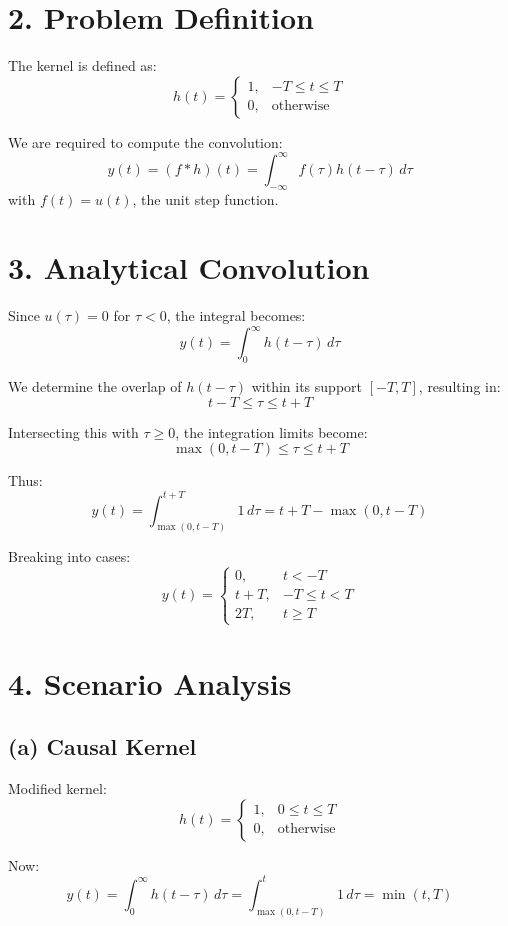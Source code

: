 \section*{2. Problem Definition}
The kernel is defined as:
\[
h(t) =
\begin{cases}
1, & -T \le t \le T \\
0, & \text{otherwise}
\end{cases}
\]

We are required to compute the convolution:
\[
y(t) = (f * h)(t) = \int_{-\infty}^{\infty} f(\tau) h(t - \tau) \, d\tau
\]
with \( f(t) = u(t) \), the unit step function.

\section*{3. Analytical Convolution}

Since \( u(\tau) = 0 \) for \( \tau < 0 \), the integral becomes:
\[
y(t) = \int_0^{\infty} h(t - \tau) \, d\tau
\]

We determine the overlap of \( h(t - \tau) \) within its support \( [-T, T] \), resulting in:
\[
t - T \le \tau \le t + T
\]

Intersecting this with \( \tau \ge 0 \), the integration limits become:
\[
\max(0, t - T) \le \tau \le t + T
\]

Thus:
\[
y(t) = \int_{\max(0, t - T)}^{t + T} 1 \, d\tau = t + T - \max(0, t - T)
\]

Breaking into cases:
\[
y(t) =
\begin{cases}
0, & t < -T \\
t + T, & -T \le t < T \\
2T, & t \ge T
\end{cases}
\]

\section*{4. Scenario Analysis}

\subsection*{(a) Causal Kernel}
Modified kernel:
\[
h(t) =
\begin{cases}
1, & 0 \le t \le T \\
0, & \text{otherwise}
\end{cases}
\]

Now:
\[
y(t) = \int_0^\infty h(t - \tau) \, d\tau
= \int_{\max(0, t - T)}^{t} 1 \, d\tau = \min(t, T)
\]

